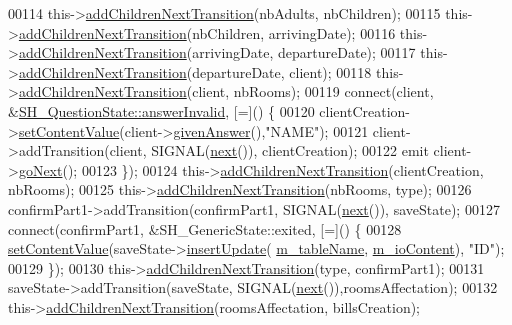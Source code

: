 \begin{DoxyCode}
00114     this->\hyperlink{classSH__InOutStateMachine_aa78420f8778d7777809aad77eb8473b4}{addChildrenNextTransition}(nbAdults, nbChildren);
00115     this->\hyperlink{classSH__InOutStateMachine_aa78420f8778d7777809aad77eb8473b4}{addChildrenNextTransition}(nbChildren, arrivingDate);
00116     this->\hyperlink{classSH__InOutStateMachine_aa78420f8778d7777809aad77eb8473b4}{addChildrenNextTransition}(arrivingDate, departureDate);
00117     this->\hyperlink{classSH__InOutStateMachine_aa78420f8778d7777809aad77eb8473b4}{addChildrenNextTransition}(departureDate, client);
00118     this->\hyperlink{classSH__InOutStateMachine_aa78420f8778d7777809aad77eb8473b4}{addChildrenNextTransition}(client, nbRooms);
00119     connect(client, &\hyperlink{classSH__QuestionState_a3348a8a683130678ac87a10ba2a25486}{SH\_QuestionState::answerInvalid}, [=]() \{
00120         clientCreation->\hyperlink{classSH__InOutStateMachine_a9ab1534306b2bdb62743d4bcefe40c17}{setContentValue}(client->\hyperlink{classSH__QuestionState_a29cdea8bc55e39e3ed02d24743c30f8c}{givenAnswer}(),\textcolor{stringliteral}{"NAME"});
00121         client->addTransition(client, SIGNAL(\hyperlink{classSH__GenericStateMachine_af4771d31d87951c997fba1633c2d67f6}{next}()), clientCreation);
00122         emit client->\hyperlink{classSH__GenericState_a34c1bebc765cc3a62d66c94c37d4f0c3}{goNext}();
00123     \});
00124     this->\hyperlink{classSH__InOutStateMachine_aa78420f8778d7777809aad77eb8473b4}{addChildrenNextTransition}(clientCreation, nbRooms);
00125     this->\hyperlink{classSH__InOutStateMachine_aa78420f8778d7777809aad77eb8473b4}{addChildrenNextTransition}(nbRooms, type);
00126     confirmPart1->addTransition(confirmPart1, SIGNAL(\hyperlink{classSH__GenericStateMachine_af4771d31d87951c997fba1633c2d67f6}{next}()), saveState);
00127     connect(confirmPart1, &SH\_GenericState::exited, [=]() \{
00128         \hyperlink{classSH__InOutStateMachine_a9ab1534306b2bdb62743d4bcefe40c17}{setContentValue}(saveState->\hyperlink{classSH__AdaptDatabaseState_a037db544ea05f42d21fcbdda758839fe}{insertUpdate}(
      \hyperlink{classSH__InOutStateMachine_aa009eecc5ab6181358faafb5996b6006}{m\_tableName}, \hyperlink{classSH__InOutStateMachine_a8cfbc27eef057bf37b7711bdfef2077e}{m\_ioContent}), \textcolor{stringliteral}{"ID"});
00129     \});
00130     this->\hyperlink{classSH__InOutStateMachine_aa78420f8778d7777809aad77eb8473b4}{addChildrenNextTransition}(type, confirmPart1);
00131     saveState->addTransition(saveState, SIGNAL(\hyperlink{classSH__GenericStateMachine_af4771d31d87951c997fba1633c2d67f6}{next}()),roomsAffectation);
00132     this->\hyperlink{classSH__InOutStateMachine_aa78420f8778d7777809aad77eb8473b4}{addChildrenNextTransition}(roomsAffectation, billsCreation);

\end{DoxyCode}

